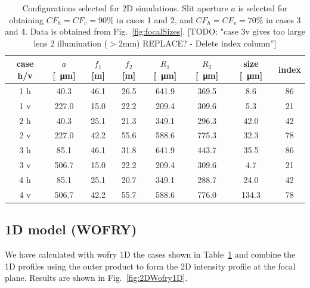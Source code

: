 \documentclass{iucr}              %
\newcommand{\todo}[1]{{\color{red}[TODO: "#1'']}}
\begin{document}
\begin{table}[]
    \label{table:2Dusercases}
    \caption{Configurations selected for 2D simulations. Slit aperture $a$ is selected for obtaining $CF_h=CF_v=$90\% in cases 1 and 2, and $CF_h=CF_v=$70\% in cases 3 and 4. Data is obtained from Fig.~\ref{fig:focalSizes}.
    \todo{case 3v gives too large lens 2 illumination ($>$2mm) REPLACE? - Delete index column}}
    \centering
    \begin{tabular}{c|c|c|c|c|c|c|c}
         case h/v & $a$ [\SI{}{\micro\meter}] & $f_1$ [m] & $f_2$ [m] & $R_1$ [\SI{}{\micro\meter}]& $R_2$ [\SI{}{\micro\meter}] & size [\SI{}{\micro\meter}]& index\\
         \hline
1 h &      40.3 & 46.1 &     26.5 &     641.9 &     369.5 &     8.6 &     86 \\
1 v &      227.0 & 15.0 &     22.2 &     209.4 &     309.6 &     5.3 &     21 \\
\hline
2 h &      40.3 & 25.1 &     21.3 &     349.1 &     296.3 &     42.0 &     42 \\
2 v &      227.0 & 42.2 &     55.6 &     588.6 &     775.3 &     32.3 &     78 \\
\hline \hline
3 h &      85.1 & 46.1 &     31.8 &     641.9 &     443.7 &     35.5 &     86 \\
3 v &      506.7 & 15.0 &     22.2 &     209.4 &     309.6 &     4.7 &     21 \\
\hline
4 h &      85.1 & 25.1 &     20.7 &     349.1 &     288.7 &     24.0 &     42 \\
4 v &      506.7 & 42.2 &     55.7 &     588.6 &     776.0 &     134.3 &     78 \\

    \end{tabular}
\end{table}





\subsection{1D model (WOFRY)}
We have calculated with wofry 1D the cases shown in Table~\ref{table:2Dusercases} and combine the 1D profiles using the outer product to form the 2D intensity profile at the focal plane. Results are shown in Fig.~\ref{fig:2DWofry1D}.
\end{document}
